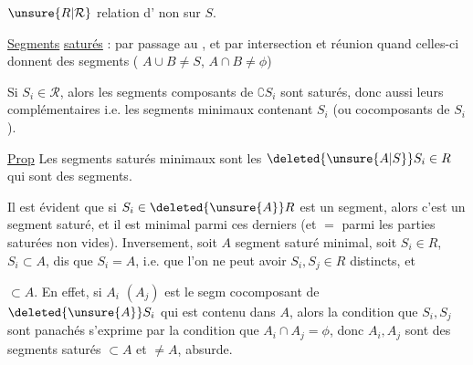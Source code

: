 $\unsure{R|\mathcal{R}}$ relation d' non  sur $S$.

\uline{Segments}  \uline{saturés} :  par passage au , et par intersection et réunion quand celles-ci donnent des segments ( $A\cup B\ne S$, $A\cap B\ne\phi$)

Si $S_i\in\mathcal{R}$, alors les segments composants de $\complement S_i$ sont saturés, donc aussi leurs complémentaires i.e. les segments minimaux contenant $S_i$ (ou  cocomposants de $S_i$). 

\noindent\llap{\rule[-.92\baselineskip]{.4pt}{1.8\baselineskip}\hspace{.35em}}\uline{Prop} Les segments saturés minimaux sont les $\deleted{\unsure{A|S}}S_i\in R$ qui sont des segments.

\reversemarginpar{}

Il est évident que si $S_i\in\deleted{\unsure{A}}R$ est un segment, alors c'est un segment saturé, et il est minimal parmi ces derniers (et $=$ parmi les parties saturées non vides). Inversement, soit $A$ segment saturé minimal,  soit $S_i\in R$, $S_i\subset A$,   dis que $S_i=A$,  i.e. que l'on ne peut avoir $S_i,S_j\in R$ distincts, et
\par\noindent\begin{minipage}[t]{.23\linewidth}
\vspace{0pt}
\end{minipage}\hfill\begin{minipage}[t]{.73\linewidth}
\vspace{0pt}
$\subset A$. En effet, si $A_i$ $(A_j)$ est le segm cocomposant de $\deleted{\unsure{A}}S_i$ qui est contenu dans $A$, alors la condition que $S_i,S_j$ sont  panachés s'exprime par la condition que $A_i\cap A_j=\phi$, donc $A_i,A_j$ sont des segments saturés $\subset A$ et $\ne A$, absurde.
\end{minipage}
\normalmarginpar
